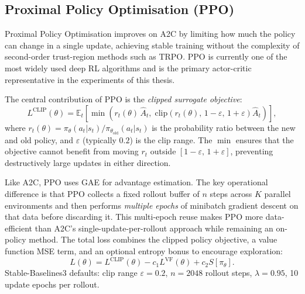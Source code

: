 \subsection{Proximal Policy Optimisation (PPO)}
\label{subsec:ppo}

Proximal Policy Optimisation \citep{schulman2017ppo} improves on A2C by limiting how much the policy can change in a single update, achieving stable training without the complexity of second-order trust-region methods such as TRPO. PPO is currently one of the most widely used deep RL algorithms and is the primary actor-critic representative in the experiments of this thesis.

{\color{red} The central contribution of PPO is the \emph{clipped surrogate objective}:
\[
  L^{\mathrm{CLIP}}(\theta) = \mathbb{E}_t\!\left[
    \min\!\left(
      r_t(\theta)\,\hat{A}_t,\;
      \mathrm{clip}\!\left(r_t(\theta),\,1{-}\varepsilon,\,1{+}\varepsilon\right)\hat{A}_t
    \right)
  \right],
\]
where $r_t(\theta) = \pi_\theta(a_t|s_t)/\pi_{\theta_\mathrm{old}}(a_t|s_t)$ is the probability ratio between the new and old policy, and $\varepsilon$ (typically $0.2$) is the clip range. The $\min$ ensures that the objective cannot benefit from moving $r_t$ outside $[1{-}\varepsilon,\,1{+}\varepsilon]$, preventing destructively large updates in either direction.}

{\color{red} Like A2C, PPO uses GAE for advantage estimation. The key operational difference is that PPO collects a fixed rollout buffer of $n$ steps across $K$ parallel environments and then performs \emph{multiple epochs} of minibatch gradient descent on that data before discarding it. This multi-epoch reuse makes PPO more data-efficient than A2C's single-update-per-rollout approach while remaining an on-policy method. The total loss combines the clipped policy objective, a value function MSE term, and an optional entropy bonus to encourage exploration:
\[
  L(\theta) = L^{\mathrm{CLIP}}(\theta) - c_1 L^{\mathrm{VF}}(\theta) + c_2 S[\pi_\theta].
\]
Stable-Baselines3 defaults: clip range $\varepsilon=0.2$, $n=2048$ rollout steps, $\lambda=0.95$, 10 update epochs per rollout.}



